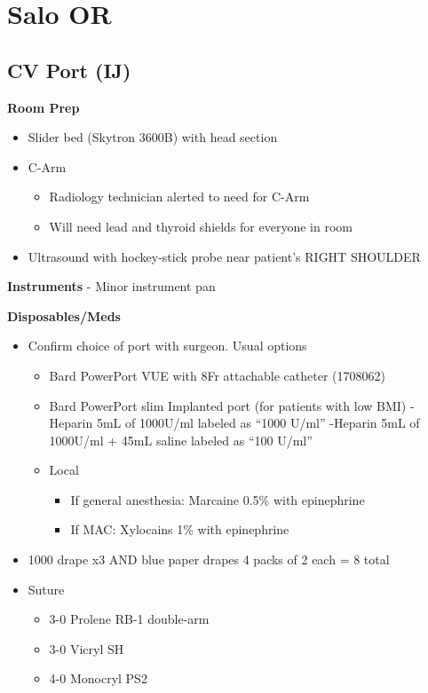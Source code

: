 \documentclass[
]{book}
\providecommand{\tightlist}{%
  \setlength{\itemsep}{0pt}\setlength{\parskip}{0pt}}
\begin{document}
\hypertarget{part-salo-or}{%
\part*{Salo OR}\label{part-salo-or}}

\hypertarget{cv_port_salo}{%
\chapter{CV Port (IJ)}\label{cv_port_salo}}

\textbf{Room Prep}

\begin{itemize}
\tightlist
\item
  Slider bed (Skytron 3600B) with head section
\item
  C-Arm

  \begin{itemize}
  \tightlist
  \item
    Radiology technician alerted to need for C-Arm
  \item
    Will need lead and thyroid shields for everyone in room
  \end{itemize}
\item
  Ultrasound with hockey-stick probe near patient's RIGHT SHOULDER
\end{itemize}

\textbf{Instruments}
- Minor instrument pan

\textbf{Disposables/Meds}

\begin{itemize}
\tightlist
\item
  Confirm choice of port with surgeon. Usual options

  \begin{itemize}
  \tightlist
  \item
    Bard PowerPort VUE with 8Fr attachable catheter (1708062)
  \item
    Bard PowerPort slim Implanted port (for patients with low BMI)
    -Heparin 5mL of 1000U/ml labeled as ``1000 U/ml''
    -Heparin 5mL of 1000U/ml + 45mL saline labeled as ``100 U/ml''
  \item
    Local

    \begin{itemize}
    \tightlist
    \item
      If general anesthesia: Marcaine 0.5\% with epinephrine
    \item
      If MAC: Xylocains 1\% with epinephrine
    \end{itemize}
  \end{itemize}
\item
  1000 drape x3 AND blue paper drapes 4 packs of 2 each = 8 total
\item
  Suture

  \begin{itemize}
  \tightlist
  \item
    3-0 Prolene RB-1 double-arm
  \item
    3-0 Vicryl SH
  \item
    4-0 Monocryl PS2
  \end{itemize}
\end{itemize}
\end{document}
